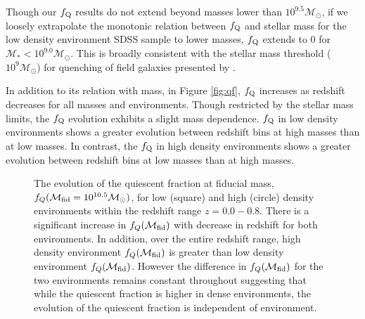 \documentclass{emulateapj}
\begin{document}
Though our $f_{\rm{Q}}$ results do not extend beyond masses lower than $10^{9.5} \mathcal{M}_{\odot}$, if we loosely extrapolate the monotonic relation between $f_{\rm{Q}}$ and stellar mass for the low density environment SDSS sample to lower masses, $f_{\rm{Q}}$ extends to $0$ for $\mathcal{M}_{*} < 10^{9.0} \mathcal{M}_{\odot}$. This is broadly consistent with the stellar mass threshold ($10^9 \mathcal{M}_{\odot}$) for quenching of field galaxies presented by \cite{Geha:2012aa}. 

In addition to its relation with mass, in Figure \ref{fig:qf}, $f_{\rm{Q}}$ increases as redshift decreases for all masses and environments. Though restricted by the stellar mass limits, the $f_{\rm{Q}}$ evolution exhibits a slight mass dependence. $f_{\rm{Q}}$ in low density environments shows a greater evolution between redshift bins at high masses than at low masses. In contrast, the $f_{\rm{Q}}$ in high density environments shows a greater evolution between redshift bins at low masses than at high masses.


\begin{figure}
    \begin{center}
        \leavevmode
        \caption{The evolution of the quiescent fraction at fiducial mass, $f_{Q}(\mathcal{M}_{\rm{fid}} = 10^{10.5} \mathcal{M}_\odot)$, for low (square) and high (circle) density environments within the redshift range $z = 0.0 - 0.8$.  There is a significant increase in $f_{Q}(\mathcal{M}_{\rm{fid}})$ with decrease in redshift for both environments. In addition, over the entire redshift range, high density environment $f_{Q}(\mathcal{M}_{\rm{fid}})$ is greater than low density environment $f_{Q}(\mathcal{M}_{\rm{fid}})$. However the difference in $f_{Q}(\mathcal{M}_{\rm{fid}})$ for the two environments remains constant throughout suggesting that while the quiescent fraction is higher in dense environments, the evolution of the quiescent fraction is independent of environment.}         \label{fig:qffit}
    \end{center}
\end{figure}
\end{document}
